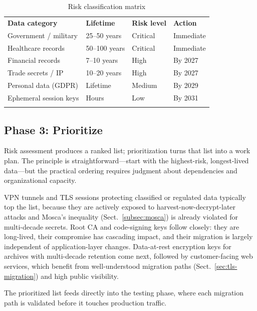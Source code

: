 \begin{table}[t]
\caption{Risk classification matrix}
\label{tab:risk-matrix}
\begin{tabular}{p{3.5cm}p{2.5cm}p{2.5cm}p{3cm}}
\hline\noalign{\smallskip}
\textbf{Data category} & \textbf{Lifetime} & \textbf{Risk level} & \textbf{Action} \\
\noalign{\smallskip}\svhline\noalign{\smallskip}
Government / military & 25--50 years & Critical & Immediate \\
Healthcare records & 50--100 years & Critical & Immediate \\
Financial records & 7--10 years & High & By 2027 \\
Trade secrets / IP & 10--20 years & High & By 2027 \\
Personal data (GDPR) & Lifetime & Medium & By 2029 \\
Ephemeral session keys & Hours & Low & By 2031 \\
\noalign{\smallskip}\hline
\end{tabular}
\end{table}

\subsection{Phase 3: Prioritize}
\label{subsec:phase-prioritize}

Risk assessment produces a ranked list; prioritization turns that list into a work plan.  The principle is straightforward---start with the highest-risk, longest-lived data---but the practical ordering requires judgment about dependencies and organizational capacity.

VPN tunnels and TLS sessions protecting classified or regulated data typically top the list, because they are actively exposed to harvest-now-decrypt-later attacks and Mosca's inequality (Sect.~\ref{subsec:mosca}) is already violated for multi-decade secrets.  Root CA and code-signing keys follow closely: they are long-lived, their compromise has cascading impact, and their migration is largely independent of application-layer changes.  Data-at-rest encryption keys for archives with multi-decade retention come next, followed by customer-facing web services, which benefit from well-understood migration paths (Sect.~\ref{sec:tls-migration}) and high public visibility.

The prioritized list feeds directly into the testing phase, where each migration path is validated before it touches production traffic.

